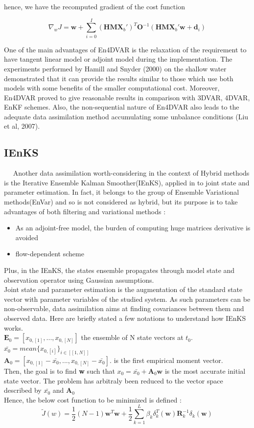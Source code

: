 \documentclass[a4,12pt]{article}
\numberwithin{equation}{section}
\begin{document}
hence, we have the recomputed gradient of the cost function

$$\nabla _{w}J = \textbf{w} + \sum_{i=0}^{I}(\textbf{HMX}_{b}')^{T}\textbf{O}^{-1}(\textbf{HMX}_{b}'\textbf{w}+\textbf{d}_{i})$$


One of the main advantages of En4DVAR is the relaxation of the requirement to have tangent linear model or adjoint model during the implementation. The experiments performed by Hamill and Snyder (2000) on the shallow water demonstrated that it can  provide the results similar to those which use both models with some benefits of the smaller computational cost. Moreover, En4DVAR proved to give reasonable results in comparison with 3DVAR, 4DVAR, EnKF schemes. Also, the non-sequential nature of En4DVAR also leads to the adequate data assimilation method accumulating some unbalance conditions (Liu et al, 2007).  


\subsection{IEnKS}
~~ Another data assimilation worth-considering in the context of Hybrid methods is the Iterative Ensemble Kalman Smoother(IEnKS), applied in \cite{jointState} to joint state and parameter estimation. In fact, it belongs to the group of Ensemble Variational methods(EnVar) and so is not considered as hybrid, but its purpose is to take advantages of both filtering and variational methods :
\begin{itemize}
\item As an adjoint-free model, the burden of computing huge matrices derivative is avoided
\item flow-dependent scheme
\end{itemize}
Plus, in the IEnKS, the states ensemble propagates through model state and observation operator using Gaussian assumptions. \\
Joint state and parameter estimation is the augmentation of the standard state vector with parameter variables of the studied system. As such parameters can be non-observable, data assimilation aims at finding covariances between them and observed data.
Here are briefly stated a few notations to understand how IEnKS works. \\
$\textbf{E}_0 = [x_{0,[1]},...,x_{0,[N]}]$ the ensemble of N state vectors at $t_0$. \\
$\bar{x_0} = mean\{x_{0,[i]}\}_{i \in [\![1,N]\!] }$ \\
$\textbf{A}_0 = [x_{0,[1]} - \bar{x_0},...,x_{0,[N]}- \bar{x_0}]$. is the first empirical moment vector.\\
Then, the goal is to find \textbf{w} such that $x_0 = \bar{x_0} + \textbf{A}_0 \textbf{w}$ is the most accurate initial state vector. The problem has arbitraly been reduced to the vector space described by $\bar{x_0}$ and $\textbf{A}_0$ \\
Hence, the below cost function to be minimized is defined : 
$$\tilde{J}(w) = \frac{1}{2}(N-1)\textbf{w}^{T}\textbf{w} + \frac{1}{2}\sum_{k=1}^{L}\beta_{k}\delta_{k}^{T}(\textbf{w})\textbf{R}_{k}^{-1}\delta_{k}(\textbf{w})$$
\end{document}
